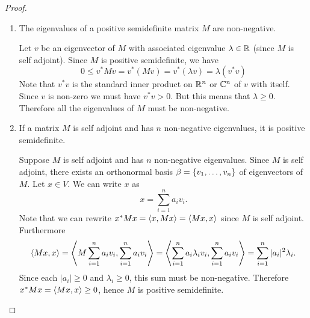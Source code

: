 \documentclass{article}
\begin{document}
\begin{proof}
    \hfill
    \begin{enumerate}[label=\alph*)]
        \item
            \begin{minithm}
                The eigenvalues of a positive semidefinite matrix $M$ are non-negative.
            \end{minithm}
            Let $v$ be an eigenvector of $M$ with associated eigenvalue $\lambda \in \mathbb{R}$ (since $M$ is self adjoint). Since $M$ is positive semidefinite, we have
            \[
                0 \leq v^* M v = v^*(Mv) = v^* (\lambda v) = \lambda (v^* v)
            \]
            Note that $v^* v$ is the standard inner product on $\mathbb{R}^n$ or $\mathbb{C}^n$ of $v$ with itself. Since $v$ is non-zero we must have $v^* v > 0$. But this means that $\lambda \geq 0$. Therefore all the eigenvalues of $M$ must be non-negative.
        \item
            \begin{minithm}
                If a matrix $M$ is self adjoint and has $n$ non-negative eigenvalues, it is positive semidefinite.
            \end{minithm}
        Suppose $M$ is self adjoint and has $n$ non-negative eigenvalues. Since $M$ is self adjoint, there exists an orthonormal basis $\beta = \qty{v_1, \ldots, v_n}$ of eigenvectors of $M$. Let $x \in V$. We can write $x$ as
        \[
            x = \sum_{i=1}^n a_i v_i
        .\]
        Note that we can rewrite $x^* M x = \iprd{x, Mx} = \iprd{Mx, x}$ since $M$ is self adjoint. Furthermore
        \[
            \iprd{Mx,x} = \iprd{M \sum_{i=1}^n a_i v_i, \sum_{i=1}^n a_i v_i} = \iprd{\sum_{i=1}^n a_i \lambda_i v_i, \sum_{i=1}^n a_i v_i} = \sum_{i=1}^n |a_i|^2 \lambda_i
        .\]
        Since each $|a_i| \geq 0$ and $\lambda_i \geq 0$, this sum must be non-negative. Therefore $x^* M x = \iprd{Mx, x} \geq 0$, hence $M$ is positive semidefinite.
    \end{enumerate}
    \renewcommand{\qedsymbol}{}
\end{proof}
\end{document}
